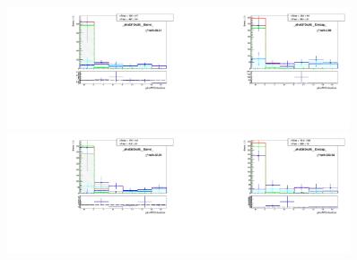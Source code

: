 \begin{figure}[htb]
  \begin{center}
   \includegraphics[width=0.45\textwidth]{../figs/figs_v11/ELECTRON_WGamma/TemplateFits/c_TEMPL_CHISO_UNblind__phoEt75to85__Barrel__RooFit_MCclosure.pdf}\includegraphics[width=0.45\textwidth]{../figs/figs_v11/ELECTRON_WGamma/TemplateFits/c_TEMPL_CHISO_UNblind__phoEt75to85__Endcap__RooFit_MCclosure.pdf}\\
   \includegraphics[width=0.45\textwidth]{../figs/figs_v11/ELECTRON_WGamma/TemplateFits/c_TEMPL_CHISO_UNblind__phoEt85to95__Barrel__RooFit_MCclosure.pdf}\includegraphics[width=0.45\textwidth]{../figs/figs_v11/ELECTRON_WGamma/TemplateFits/c_TEMPL_CHISO_UNblind__phoEt85to95__Endcap__RooFit_MCclosure.pdf}\\

\end{center}
\end{figure}
